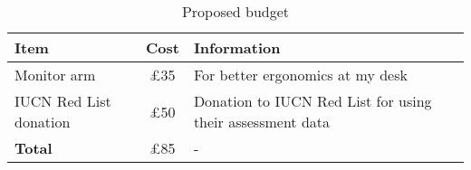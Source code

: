 \documentclass[11pt, a4paper, titlepage]{article}
\begin{document}
\begin{table}[h!]
    \small
    \begin{tabular}{| l | c | l |} \hline
        \textbf{Item} & \textbf{Cost} & \textbf{Information} \\ \hline
        Monitor arm & £35 & For better ergonomics at my desk \\ \hline
        IUCN Red List donation & £50 & Donation to IUCN Red List for using their assessment data \\ \hline
        \textbf{Total} & £85 & - \\ \hline
    \end{tabular}
    \caption{Proposed budget}
\end{table}

\printbibliography
\end{document}
